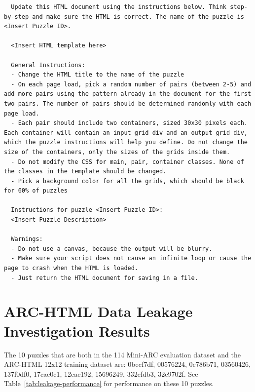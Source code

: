 \documentclass[10pt,twocolumn]{article}
\begin{document}
\begin{lstlisting}
  Update this HTML document using the instructions below. Think step-by-step and make sure the HTML is correct. The name of the puzzle is <Insert Puzzle ID>.

  <Insert HTML template here>

  General Instructions:
  - Change the HTML title to the name of the puzzle
  - On each page load, pick a random number of pairs (between 2-5) and add more pairs using the pattern already in the document for the first two pairs. The number of pairs should be determined randomly with each page load.
  - Each pair should include two containers, sized 30x30 pixels each. Each container will contain an input grid div and an output grid div, which the puzzle instructions will help you define. Do not change the size of the containers, only the sizes of the grids inside them.
  - Do not modify the CSS for main, pair, container classes. None of the classes in the template should be changed.
  - Pick a background color for all the grids, which should be black for 60% of puzzles

  Instructions for puzzle <Insert Puzzle ID>:
  <Insert Puzzle Description>

  Warnings:
  - Do not use a canvas, because the output will be blurry.
  - Make sure your script does not cause an infinite loop or cause the page to crash when the HTML is loaded.
  - Just return the HTML document for saving in a file.

\end{lstlisting}

\section{ARC-HTML Data Leakage Investigation Results}
\label{app:leakage-results}

The 10 puzzles that are both in the 114 Mini-ARC evaluation dataset
and the ARC-HTML 12x12 training dataset are: 0becf7df, 00576224,
0c786b71, 03560426, 137f0df0, 17cae0c1, 12eac192, 15696249, 332efdb3,
32e9702f. See Table~\ref{tab:leakage-performance} for performance on
these 10 puzzles.
\end{document}
